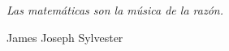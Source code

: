 
\cleardoublepage

\thispagestyle{empty} 

\begin{flushright}
	\emph{Las matemáticas son la música de la razón.}
	
	\small{James Joseph Sylvester}
\end{flushright}

\vspace*{\fill}

\clearpage
